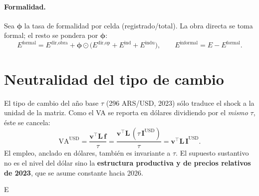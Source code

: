 \documentclass[11pt]{article}
\newcommand{\USD}{\mathrm{USD}}
\begin{document}
\paragraph{Formalidad.} Sea $\boldsymbol{\phi}$ la tasa de formalidad por celda (registrado/total). La obra directa se toma formal; el resto se pondera por $\boldsymbol{\phi}$:
\begin{equation}
E^{\text{formal}} = E^{\text{dir,obra}} + \boldsymbol{\phi}\odot\big(E^{\text{dir,op}}+E^{\text{ind}}+E^{\text{indu}}\big),\qquad
E^{\text{informal}}=E-E^{\text{formal}}.
\end{equation}

\section{Neutralidad del tipo de cambio}
El tipo de cambio del año base $\tau$ (296 ARS/USD, 2023) sólo traduce el shock a la unidad de la matriz. Como el VA se reporta en dólares dividiendo por el \emph{mismo} $\tau$, éste se cancela:
\begin{equation}
\mathrm{VA}^{\USD}=\frac{\mathbf{v}^{\!\top}\mathbf{L}\,\mathbf{f}}{\tau}=\frac{\mathbf{v}^{\!\top}\mathbf{L}\,(\tau\,\mathbf{I}^{\USD})}{\tau}=\mathbf{v}^{\!\top}\mathbf{L}\,\mathbf{I}^{\USD}.
\end{equation}
El empleo, anclado en dólares, también es invariante a $\tau$. El supuesto sustantivo no es el nivel del dólar sino la \textbf{estructura productiva y de precios relativos de 2023}, que se asume constante hacia 2026.


E%
\end{document}
